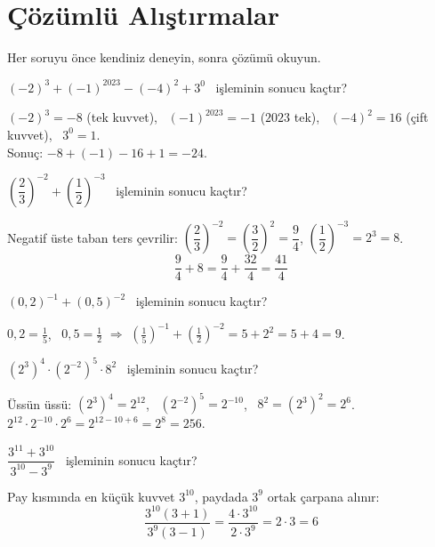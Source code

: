 \section{Çözümlü Alıştırmalar}
Her soruyu önce kendiniz deneyin, sonra çözümü okuyun.

\begin{alistirma}
\((-2)^3+(-1)^{2023}-(-4)^2+3^0\) \ işleminin sonucu kaçtır?
\end{alistirma}
\begin{cozum}
\((-2)^3=-8\) (tek kuvvet), \ \((-1)^{2023}=-1\) (\(2023\) tek), \ \((-4)^2=16\) (çift kuvvet), \ \(3^0=1\).\\
Sonuç: \(-8+(-1)-16+1=-24\).
\end{cozum}

\begin{alistirma}
\(\left(\dfrac23\right)^{-2}+\left(\dfrac12\right)^{-3}\) \ işleminin sonucu kaçtır?
\end{alistirma}
\begin{cozum}
Negatif üste taban ters çevrilir: \(\left(\dfrac23\right)^{-2}=\left(\dfrac32\right)^{2}=\dfrac94\), \quad \(\left(\dfrac12\right)^{-3}=2^3=8\).
\[\frac94+8=\frac94+\frac{32}{4}=\frac{41}{4}\]
\end{cozum}

\begin{alistirma}
\((0{,}2)^{-1}+(0{,}5)^{-2}\) \ işleminin sonucu kaçtır?
\end{alistirma}
\begin{cozum}
\(0{,}2=\frac15\), \ \(0{,}5=\frac12\) \(\Rightarrow\) \(\left(\frac15\right)^{-1}+\left(\frac12\right)^{-2}=5+2^2=5+4=9\).
\end{cozum}

\begin{alistirma}
\((2^3)^4\cdot(2^{-2})^5\cdot 8^2\) \ işleminin sonucu kaçtır?
\end{alistirma}
\begin{cozum}
Üssün üssü: \((2^3)^4=2^{12}\), \ \((2^{-2})^5=2^{-10}\), \ \(8^2=(2^3)^2=2^6\).\\
\(2^{12}\cdot 2^{-10}\cdot 2^{6}=2^{12-10+6}=2^{8}=256\).
\end{cozum}

\begin{alistirma}
\(\dfrac{3^{11}+3^{10}}{3^{10}-3^{9}}\) \ işleminin sonucu kaçtır?
\end{alistirma}
\begin{cozum}
Pay kısmında en küçük kuvvet \(3^{10}\), paydada \(3^{9}\) ortak çarpana alınır:
\[\frac{3^{10}(3+1)}{3^{9}(3-1)}=\frac{4\cdot 3^{10}}{2\cdot 3^{9}}=2\cdot 3=6\]
\end{cozum}

